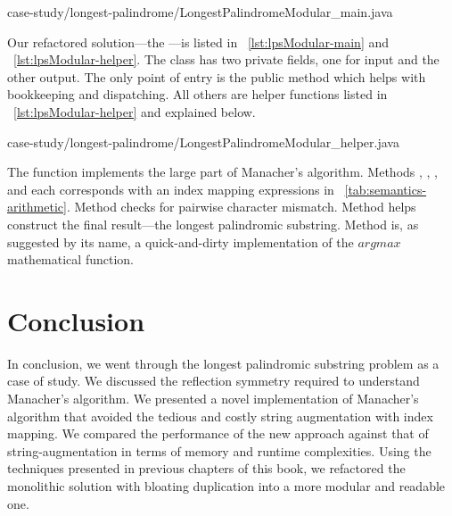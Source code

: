 \begin{clisting}[tb]
    
    {case-study/longest-palindrome/LongestPalindromeModular_main.java}
\end{clisting}

Our refactored solution---the ---is listed in
~\autoref{lst:lpsModular-main} and ~\autoref{lst:lpsModular-helper}.
The class has two private fields, one for input and the other output.
The only point of entry is the public method  which
helps with bookkeeping and dispatching.
All others are helper functions listed in ~\autoref{lst:lpsModular-helper} and
explained below.


{case-study/longest-palindrome/LongestPalindromeModular_helper.java}

The  function implements the large part of Manacher's algorithm.
Methods , , , and 
each corresponds with an index mapping expressions in \mbox{~\autoref{tab:semantics-arithmetic}}.
Method  checks for pairwise character mismatch.
Method  helps construct the final result---the longest palindromic substring.
Method  is, as suggested by its name, a quick-and-dirty implementation of the $argmax$
mathematical function.

\section{Conclusion}\label{sec:conclusion}

In conclusion, we went through the longest palindromic substring
problem as a case of study.
We discussed the reflection symmetry required to understand Manacher's algorithm.
We presented a novel implementation of Manacher's algorithm that avoided the tedious and
costly string augmentation with index mapping.
We compared the performance of the new approach against that of string-augmentation in
terms of memory and runtime complexities.
Using the techniques presented in previous chapters of this book, we refactored the monolithic
solution with bloating duplication into a more modular and readable one.
